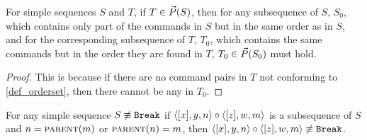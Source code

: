 \begin{mycor}\label{subseq_in_orderset}
For simple sequences $S$ and $T$,
if $T\in\vec{P}({S})$, then for any subsequence of $S$, $S_0$, which contains
only part of the commands in $S$ but in the same order as in $S$,
and for the corresponding subsequence of $T$, $T_0$, which
contains the same commands but in the order they are found in $T$,
$T_0\in\vec{P}({S_0})$ must hold.
\end{mycor}
\begin{proof}
This is because
if there are no command pairs in $T$ not conforming to \cref{def_orderset},
then there cannot be any in $T_0$.
\end{proof}

\begin{mylem}\label{simple_distant_pairs}
For any simple sequence $S\not\equiv\mathtt{Break}$
if $\langle{[x],y,n}\rangle\circ\langle{[z],w,m}\rangle$ is a subsequence of $S$ and $n=\text{\normalfont\scshape{parent}}(m)$ or $\text{\normalfont\scshape{parent}}(n)=m$,
then $\langle{[x],y,n}\rangle\circ\langle{[z],w,m}\rangle\not\equiv\mathtt{Break}$.
\end{mylem}
